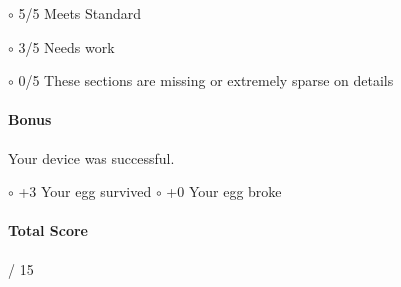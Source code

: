 \documentclass[10pt]{exam}
\begin{document}
$\circ$ 5/5 Meets Standard \hfill

$\circ$ 3/5 Needs work \hfill

$\circ$ 0/5 These sections are missing or extremely sparse on details \hfill



\paragraph{Bonus}  Your device was successful.

$\circ$ +3 Your egg survived \hfill
$\circ$ +0 Your egg broke \hfill{}



\paragraph{Total Score} \fillin[][5em] / 15
\end{document}
